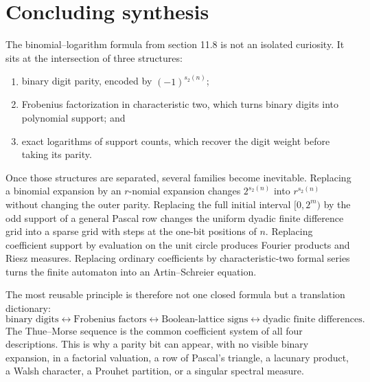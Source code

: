 \documentclass[11pt,oneside]{article}
\theoremstyle{definition}
\theoremstyle{remark}
\newcommand{\swt}{s_2}
\newcommand{\1}{\mathbf 1}
\begin{document}
\section{Concluding synthesis}
\label{p3:sec:conclusion}

The binomial--logarithm formula from section 11.8 is not an isolated curiosity.  It sits at the
intersection of three structures:

\begin{enumerate}
\item binary digit parity, encoded by \((-1)^{\swt(n)}\);
\item Frobenius factorization in characteristic two, which turns binary digits into polynomial
      support; and
\item exact logarithms of support counts, which recover the digit weight before taking its
      parity.
\end{enumerate}

Once those structures are separated, several families become inevitable.  Replacing a
binomial expansion by an \(r\)-nomial expansion changes \(2^{\swt(n)}\) into
\(r^{\swt(n)}\) without changing the outer parity.  Replacing the full initial interval
\([0,2^m)\) by the odd support of a general Pascal row changes the uniform dyadic finite
difference grid into a sparse grid with steps at the one-bit positions of \(n\).  Replacing
coefficient support by evaluation on the unit circle produces Fourier products and Riesz
measures.  Replacing ordinary coefficients by characteristic-two formal series turns the
finite automaton into an Artin--Schreier equation.

The most reusable principle is therefore not one closed formula but a translation dictionary:
\[
 \boxed{
 \text{binary digits}
 \longleftrightarrow
 \text{Frobenius factors}
 \longleftrightarrow
 \text{Boolean-lattice signs}
 \longleftrightarrow
 \text{dyadic finite differences}.}
\]
The Thue--Morse sequence is the common coefficient system of all four descriptions.  This is
why a parity bit can appear, with no visible binary expansion, in a factorial valuation, a row
of Pascal's triangle, a lacunary product, a Walsh character, a Prouhet partition, or a
singular spectral measure.
\end{document}
